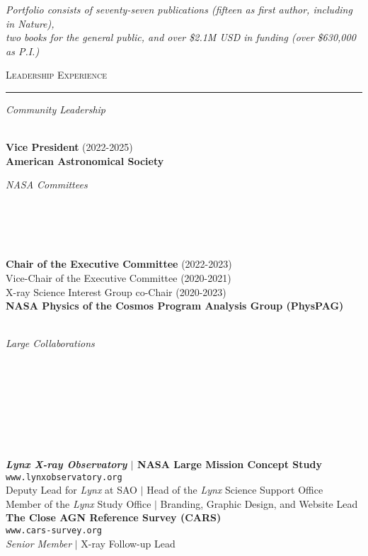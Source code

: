 \documentclass[11pt]{article}
\makeatletter
\def\vhrulefill#1{\leavevmode\leaders\hrule\@height#1\hfill \kern\z@}
\makeatother
\begin{document}
\begin{center}
\textit{Portfolio consists of seventy-seven publications (fifteen as first author, including in Nature), \\ two books for the general public, and over \$2.1M USD in funding (over \$630,000 as P.I.) }  \\
\end{center}


\clearpage




\textsc{Leadership Experience} \vhrulefill{0.4pt}


\vspace{6mm}


\hspace{2.5mm} \parbox{1.5in}{\textit{Community Leadership}\\\\} \parbox{5.15in}{\textbf{Vice President} (2022-2025) \\  \textbf{American Astronomical Society}\\
}

\hspace{2.5mm} \parbox{1.5in}{\textit{NASA Committees}\\\\\\\\\\} \parbox{5.15in}{\textbf{Chair of the Executive Committee} (2022-2023) \\ Vice-Chair of the Executive Committee (2020-2021) \\ X-ray Science Interest Group co-Chair (2020-2023) \\ \textbf{NASA Physics of the Cosmos Program Analysis Group (PhysPAG)}\\\\
}


\hspace{2.5mm} \parbox{1.5in}{\textit{Large Collaborations \\\\\\\\\\\\\\\\}} \parbox{5.15in}{\textbf{\textit{Lynx X-ray Observatory} $|$ NASA Large Mission Concept Study} \\
\texttt{www.lynxobservatory.org} \\ Deputy Lead for \textit{Lynx} at SAO $|$ Head of the \textit{Lynx} Science Support Office \\ Member of the \textit{Lynx} Study Office $|$ Branding, Graphic Design, and Website Lead \\




\textbf{The Close AGN Reference Survey (CARS)} \\ \texttt{www.cars-survey.org} \\ \textit{Senior Member} $|$ X-ray Follow-up Lead \\
}
\end{document}
